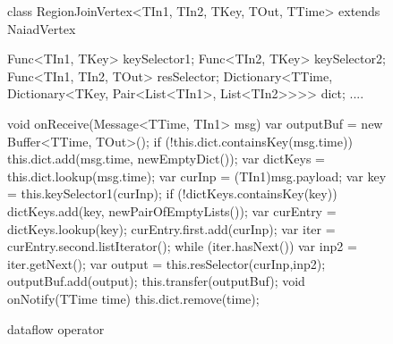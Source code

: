 \begin{figure}[t!]
\begin{numcodejava}
class RegionJoinVertex<TIn1, TIn2, TKey, 
          TOut, TTime> extends NaiadVertex
{
  Func<TIn1, TKey> keySelector1;
  Func<TIn2, TKey> keySelector2;
  Func<TIn1, TIn2, TOut> resSelector;
  Dictionary<TTime,
    Dictionary<TKey, Pair<List<TIn1>, 
                          List<TIn2>>>> dict;
  ....

  void onReceive(Message<TTime, TIn1> msg) {
    var outputBuf = new Buffer<TTime, TOut>();
    if (!this.dict.containsKey(msg.time)) {
      this.dict.add(msg.time, newEmptyDict());
    }
    var dictKeys = this.dict.lookup(msg.time);
    var curInp = (TIn1)msg.payload;
    var key = this.keySelector1(curInp);
    if (!dictKeys.containsKey(key)) {
      dictKeys.add(key, newPairOfEmptyLists());
    }
    var curEntry = dictKeys.lookup(key);
    curEntry.first.add(curInp);
    var iter = curEntry.second.listIterator();
    while (iter.hasNext()) {
      var inp2 = iter.getNext();
      var output = this.resSelector(curInp,inp2);
      outputBuf.add(output);
    }
    this.transfer(outputBuf);
  }
  void onNotify(TTime time) {
    this.dict.remove(time);
  }
}
\end{numcodejava}
\caption{ dataflow operator}
\label{fig:motivating-eg}
\end{figure}
